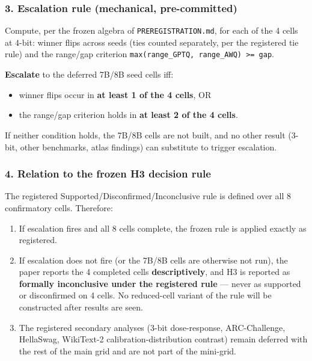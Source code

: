 \subsubsection{3. Escalation rule (mechanical, pre-committed)}
Compute, per the frozen algebra of \texttt{PREREGISTRATION.md}, for each of the 4 cells at 4-bit: winner flips across seeds (ties counted separately, per the registered tie rule) and the range/gap criterion \texttt{max(range\_GPTQ, range\_AWQ) >= gap}.

\textbf{Escalate} to the deferred 7B/8B seed cells iff:

\begin{itemize}
\item winner flips occur in \textbf{at least 1 of the 4 cells}, OR
\item the range/gap criterion holds in \textbf{at least 2 of the 4 cells}.
\end{itemize}
If neither condition holds, the 7B/8B cells are not built, and no other result (3-bit, other benchmarks, atlas findings) can substitute to trigger escalation.

\subsubsection{4. Relation to the frozen H3 decision rule}
The registered Supported/Disconfirmed/Inconclusive rule is defined over all 8 confirmatory cells. Therefore:

\begin{enumerate}
\item If escalation fires and all 8 cells complete, the frozen rule is applied exactly as registered.
\item If escalation does not fire (or the 7B/8B cells are otherwise not run), the paper reports the 4 completed cells \textbf{descriptively}, and H3 is reported as \textbf{formally inconclusive under the registered rule} --- never as supported or disconfirmed on 4 cells. No reduced-cell variant of the rule will be constructed after results are seen.
\item The registered secondary analyses (3-bit dose-response, ARC-Challenge, HellaSwag, WikiText-2 calibration-distribution contrast) remain deferred with the rest of the main grid and are not part of the mini-grid.
\end{enumerate}
